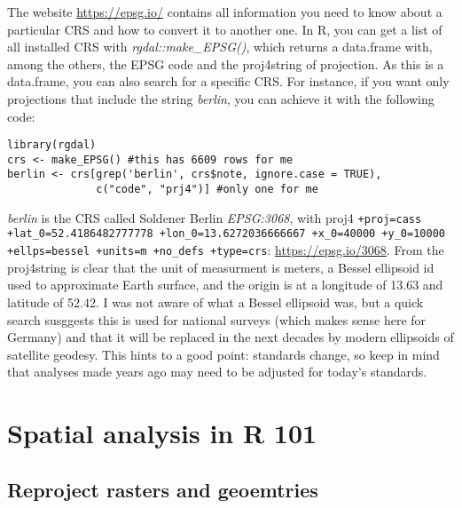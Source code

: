 \documentclass{book}
\begin{document}
The website \href{https://epsg.io/}{https://epsg.io/} contains all information you need to know about a particular CRS and how to convert it to another one. 
In R, you can get a list of all installed CRS with \textit{rgdal::make\_EPSG()}, which returns a data.frame with, among the others, the EPSG code and the proj4string of projection. 
As this is a data.frame, you can also search for a specific CRS. For instance, if you want only projections that include the string \textit{berlin}, you can achieve it with the following code:

\begin{lstlisting}
library(rgdal)
crs <- make_EPSG() #this has 6609 rows for me
berlin <- crs[grep('berlin', crs$note, ignore.case = TRUE),
              c("code", "prj4")] #only one for me
\end{lstlisting}
\textit{berlin} is the CRS called Soldener Berlin \textit{EPSG:3068}, with proj4 \texttt{+proj=cass +lat\_0=52.4186482777778 +lon\_0=13.6272036666667 +x\_0=40000 +y\_0=10000 +ellps=bessel +units=m +no\_defs +type=crs}: \href{https://epsg.io/3068}{https://epsg.io/3068}. 
From the proj4string is clear that the unit of measurment is meters, a Bessel ellipsoid id used to approximate Earth surface, and the origin is at a longitude of 13.63 and latitude of 52.42. 
I was not aware of what a Bessel ellipsoid was, but a quick search susggests this is used for national surveys (which makes sense here for Germany) and that it will be replaced in the next decades by modern ellipsoids of satellite geodesy. 
This hints to a good point: standards change, so keep in mind that analyses made years ago may need to be adjusted for today's standards.

\section{Spatial analysis in R 101}
\subsection{Reproject rasters and geoemtries}
\end{document}
